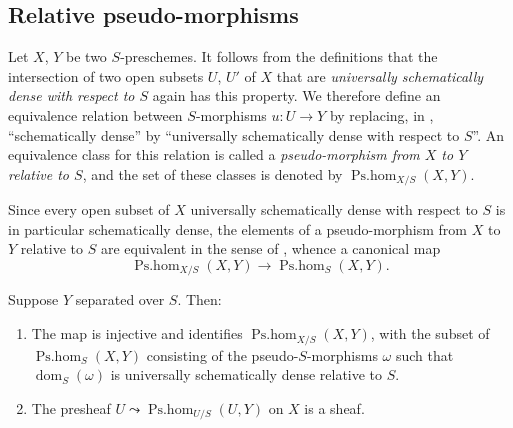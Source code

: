 \subsection{Relative pseudo-morphisms}

\begin{env}[20.5.1]\label{IV.20.5.1}
Let $X$, $Y$ be two $S$-preschemes.
It follows from the definitions  that the intersection of two open subsets $U$, $U'$ of $X$ that are \emph{universally schematically dense with respect to $S$} again has this property.
We therefore define an equivalence relation between $S$-morphisms $u:U\to Y$ by replacing, in , ``schematically dense'' by ``universally schematically dense with respect to $S$''.
An equivalence class for this relation is called a \emph{pseudo-morphism from $X$ to $Y$ relative to $S$}, and the set of these classes is denoted by $\operatorname{Ps.hom}_{X/S}(X,Y)$.
\end{env}

\begin{env}[20.5.2]
\label{IV.20.5.2}
Since every open subset of $X$ universally schematically dense with respect to $S$ is in particular schematically dense, the elements of a pseudo-morphism
from $X$ to $Y$ relative to $S$ are equivalent in the sense of , whence a canonical map
\[
\label{IV.20.5.2.1}
  \operatorname{Ps.hom}_{X/S}(X,Y)\to\operatorname{Ps.hom}_S(X,Y).
  \tag{20.5.2.1}
\]
\end{env}

\begin{proposition}[20.5.3]
\label{IV.20.5.3}
Suppose $Y$ separated over $S$.
Then:
\begin{enumerate}[label=\emph{(\roman*)}]
  \item The map  is injective and identifies $\operatorname{Ps.hom}_{X/S}(X,Y)$, with the subset of $\operatorname{Ps.hom}_S(X,Y)$ consisting of the pseudo-$S$-morphisms $\omega$ such that $\operatorname{dom}_S(\omega)$ is universally schematically dense relative to $S$.
  \item The presheaf $U\leadsto\operatorname{Ps.hom}_{U/S}(U,Y)$ on $X$ is a sheaf.
\end{enumerate}
\end{proposition}

